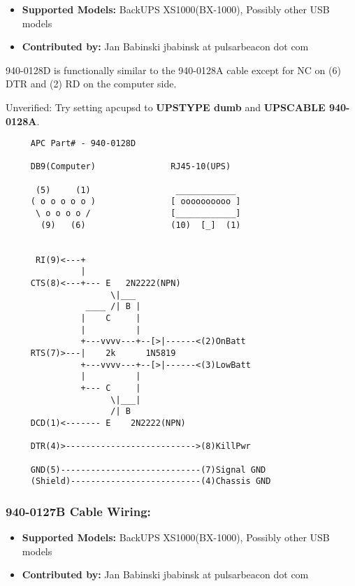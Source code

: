 \begin{itemize}
\item {\bf Supported Models:} BackUPS XS1000(BX-1000), Possibly other USB models
\item {\bf Contributed by:} Jan Babinski \lt{}jbabinsk at pulsarbeacon dot com\gt{}
\end{itemize}

940-0128D is functionally similar to the 940-0128A cable except for NC on (6)
DTR and (2) RD on the computer side. 

Unverified: Try setting apcupsd to {\bf UPSTYPE dumb} and {\bf UPSCABLE 940-0128A}.

\footnotesize
\begin{verbatim}
     APC Part# - 940-0128D
     
     DB9(Computer)               RJ45-10(UPS)
     
      (5)     (1)                 ____________
     ( o o o o o )               [ oooooooooo ]
      \ o o o o /                [____________]
       (9)   (6)                 (10)  [_]  (1)
     
     
      RI(9)<---+
               |
     CTS(8)<---+--- E   2N2222(NPN)
                     \|___
                ____ /| B |
               |    C     |
               |          |
               +---vvvv---+--[>|------<(2)OnBatt
     RTS(7)>---|    2k      1N5819
               +---vvvv---+--[>|------<(3)LowBatt
               |          |
               +--- C     |
                     \|___|
                     /| B
     DCD(1)<------- E    2N2222(NPN)
     
     DTR(4)>-------------------------->(8)KillPwr
     
     GND(5)----------------------------(7)Signal GND
     (Shield)--------------------------(4)Chassis GND
\end{verbatim}
\normalsize

\subsubsection*{940-0127B Cable Wiring:}

\begin{itemize}
\item {\bf Supported Models:} BackUPS XS1000(BX-1000), Possibly other USB models
\item {\bf Contributed by:} Jan Babinski \lt{}jbabinsk at pulsarbeacon dot com\gt{}
\end{itemize}


